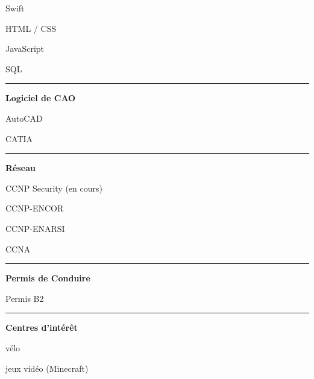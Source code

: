 \documentclass[a4paper]{letter}
\newcommand{\divider}{\rule{\linewidth}{0.9pt}}
\begin{document}
\begin{minipage}[t]{0.30\textwidth}
\faCircleNotch \quad Swift

\faCircleNotch \quad HTML / CSS

\faCircleNotch \quad JavaScript

\faCircleNotch \quad SQL

\divider


{\large \textbf{Logiciel de CAO}}

\faCircleNotch \quad AutoCAD

\faCircleNotch \quad CATIA

\divider



{\large \textbf{Réseau}}

\faNetworkWired \quad CCNP Security (en cours)

\faNetworkWired \quad CCNP-ENCOR

\faNetworkWired \quad CCNP-ENARSI

\faNetworkWired \quad CCNA


\divider

{\large \textbf{Permis de Conduire}}

\faCar \quad Permis B2

\divider

{\large \textbf{Centres d'intérêt}}

\faBicycle \quad vélo

\faGamepad \quad jeux vidéo (Minecraft)


\end{minipage}
\hspace{2mm}
\end{document}
